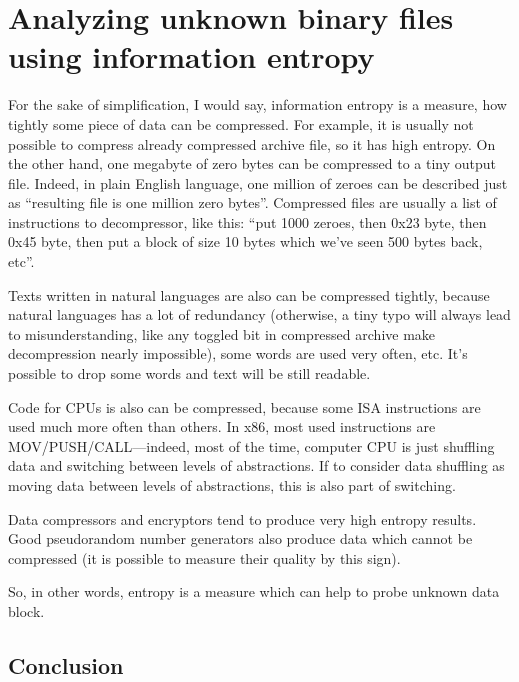 \section[Analyzing using information entropy]{Analyzing unknown binary files using information entropy}
\label{entropy}

For the sake of simplification, I would say, information entropy is a measure, how tightly some piece of data can be compressed.
For example, it is usually not possible to compress already compressed archive file, so it has high entropy.
On the other hand, one megabyte of zero bytes can be compressed to a tiny output file.
Indeed, in plain English language, one million of zeroes can be described just as ``resulting file is one million zero bytes''.
Compressed files are usually a list of instructions to decompressor, like this: ``put 1000 zeroes, then 0x23 byte, then 0x45 byte, then put a block of size 10 bytes which we've seen 500 bytes back, etc''.

Texts written in natural languages are also can be compressed tightly, 
because natural languages has a lot of redundancy
(otherwise, a tiny typo will always lead to misunderstanding, 
like any toggled bit in compressed archive make decompression nearly impossible), 
some words are used very often, etc.
It's possible to drop some words and text will be still readable.

Code for CPUs is also can be compressed, because some ISA instructions are used much more often than others.
In x86, most used instructions are MOV/PUSH/CALL---indeed, most of the time, computer CPU is just shuffling data and switching between
levels of abstractions.
If to consider data shuffling as moving data between levels of abstractions, this is also part of switching.

Data compressors and encryptors tend to produce very high entropy results.
Good pseudorandom number generators also produce data which cannot be compressed 
(it is possible to measure their quality by this sign).

So, in other words, entropy is a measure which can help to probe unknown data block.



\subsection{Conclusion}

